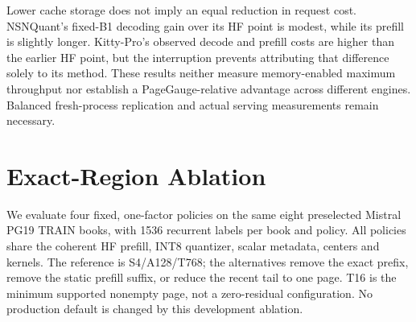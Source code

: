 \documentclass{article}
\begin{document}
\begin{table}[t]
\caption{Native request-cost pilots on one exposed TRAIN fixture per model.
Medians and within-process repeat ranges, not confidence intervals. Peak is
the maximum allocated storage across prefill/decode repeats, including model
weights; served KV and its reduction are separate. Kitty-Pro was rerun after
an external interruption, while the three completed arms were retained.
The time gap precludes an adjacent matched Kitty speed comparison.}
\label{tab:nativecost}\centering\small

\end{table}

\begin{table}[t]
\caption{Fixed regional-policy ablation on eight PG19 TRAIN books. Ratios
near one indicate similar model-token PPL, not a prospective non-inferiority
test. The interval is a paired-book descriptive bootstrap relative to the
reference PageGauge policy; top-1 agreement is instead relative to HF.
KV reduction uses the same full FP16 cache as the denominator for every row.}
\label{tab:regional}\centering\small

\end{table}

Lower cache storage does not imply an equal reduction in request cost.
NSNQuant's fixed-B1 decoding gain over its HF point is modest, while its
prefill is slightly longer. Kitty-Pro's observed decode and prefill costs are
higher than the earlier HF point, but the interruption prevents attributing
that difference solely to its method. These results neither measure
memory-enabled maximum throughput nor establish a PageGauge-relative advantage
across different engines. Balanced fresh-process replication and actual
serving measurements remain necessary.

\section{Exact-Region Ablation}
We evaluate four fixed, one-factor policies on the same eight preselected
Mistral PG19 TRAIN books, with 1536 recurrent labels per book and policy.
All policies share the coherent HF prefill, INT8 quantizer, scalar metadata,
centers and kernels. The reference is S4/A128/T768; the alternatives remove
the exact prefix, remove the static prefill suffix, or reduce the recent tail
to one page. T16 is the minimum supported nonempty page, not a zero-residual
configuration. No production default is changed by this development ablation.
\end{document}
